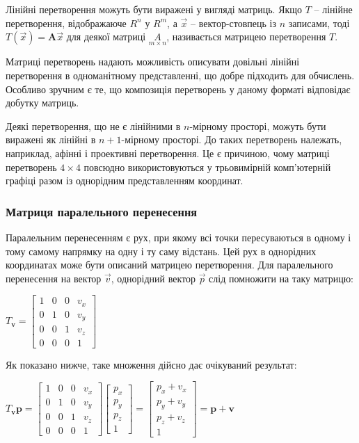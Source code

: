 Лінійні перетворення можуть бути виражені у вигляді матриць. Якщо $T$ -- лінійне перетворення, відображаюче $R^n$ у $R^m$, а $\vec x$ -- вектор-стовпець із $n$ записами, тоді
$T( \vec x ) = \mathbf{A} \vec x$
для деякої матриці $\underset{m \times n}{A}$, називається матрицею перетворення $T$.

Матриці перетворень надають можливість описувати довільні лінійні перетворення в одноманітному представленні, що добре підходить для обчислень. Особливо зручним є те, що композиція перетворень у даному форматі відповідає добутку матриць.

Деякі перетворення, що не є лінійними в $n$-мірному просторі, можуть бути виражені як лінійні в $n+1$-мірному просторі. До таких перетворень належать, наприклад, афінні і проективні перетворення. Це є причиною, чому матриці перетворень $4 \times 4$ повсюдно використовуються у трьовимірній комп'ютерній графіці разом із однорідним представленням координат.

\subsubsection{Матриця паралельного перенесення}

Паралельним перенесенням є рух, при якому всі точки пересуваються в одному і тому самому напрямку на одну і ту саму відстань. Цей рух в однорідних координатах може бути описаний матрицею перетворення. Для паралельного перенесення на вектор $\vec v$, однорідний вектор $\vec p$ слід помножити на таку матрицю:

\begin{center}
  $T_{\mathbf{v}} =
  \begin{bmatrix}
    1 & 0 & 0 & v_x \\
    0 & 1 & 0 & v_y \\
    0 & 0 & 1 & v_z \\
    0 & 0 & 0 & 1
  \end{bmatrix}$
\end{center}

Як показано нижче, таке множення дійсно дає очікуваний результат:

\begin{center}
  $T_{\mathbf{v}} \mathbf{p} =
  \begin{bmatrix}
    1 & 0 & 0 & v_x \\
    0 & 1 & 0 & v_y\\
    0 & 0 & 1 & v_z\\
    0 & 0 & 0 & 1
  \end{bmatrix}
  \begin{bmatrix}
    p_x \\ p_y \\ p_z \\ 1
  \end{bmatrix}
  =
  \begin{bmatrix}
    p_x + v_x \\ p_y + v_y \\ p_z + v_z \\ 1
  \end{bmatrix}
  = \mathbf{p} + \mathbf{v}$
\end{center}

